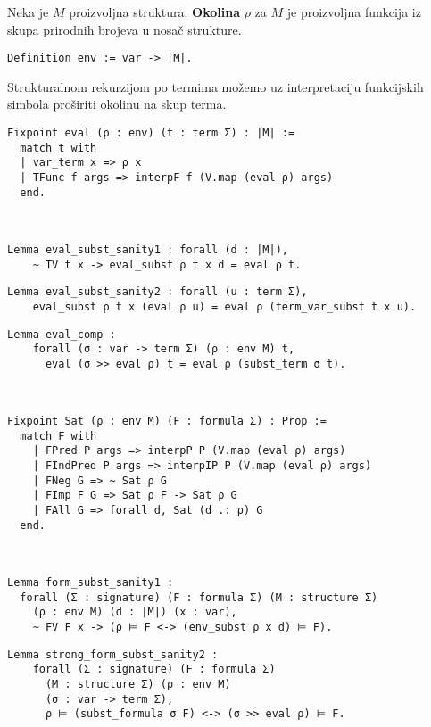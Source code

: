 \begin{definition}
  Neka je \(M\) proizvoljna struktura. \textbf{Okolina} \(\rho\) za \(M\) je proizvoljna funkcija iz skupa prirodnih brojeva u nosač strukture.
\begin{verbatim}
Definition env := var -> |M|.
\end{verbatim}
  Strukturalnom rekurzijom po termima možemo uz interpretaciju funkcijskih simbola proširiti okolinu na skup terma.
\begin{verbatim}
Fixpoint eval (ρ : env) (t : term Σ) : |M| :=
  match t with
  | var_term x => ρ x
  | TFunc f args => interpF f (V.map (eval ρ) args)
  end.
\end{verbatim}
\end{definition}

\begin{lemma}\
\begin{verbatim}
Lemma eval_subst_sanity1 : forall (d : |M|),
    ~ TV t x -> eval_subst ρ t x d = eval ρ t.
\end{verbatim}
\begin{verbatim}
Lemma eval_subst_sanity2 : forall (u : term Σ),
    eval_subst ρ t x (eval ρ u) = eval ρ (term_var_subst t x u).
\end{verbatim}
\begin{verbatim}
Lemma eval_comp :
    forall (σ : var -> term Σ) (ρ : env M) t,
      eval (σ >> eval ρ) t = eval ρ (subst_term σ t).
\end{verbatim}
\end{lemma}

\begin{definition}\
\begin{verbatim}
Fixpoint Sat (ρ : env M) (F : formula Σ) : Prop :=
  match F with
    | FPred P args => interpP P (V.map (eval ρ) args)
    | FIndPred P args => interpIP P (V.map (eval ρ) args)
    | FNeg G => ~ Sat ρ G
    | FImp F G => Sat ρ F -> Sat ρ G
    | FAll G => forall d, Sat (d .: ρ) G
  end.
\end{verbatim}
\end{definition}

\begin{lemma}\
\begin{verbatim}
Lemma form_subst_sanity1 :
  forall (Σ : signature) (F : formula Σ) (M : structure Σ)
    (ρ : env M) (d : |M|) (x : var),
    ~ FV F x -> (ρ ⊨ F <-> (env_subst ρ x d) ⊨ F).
\end{verbatim}
\begin{verbatim}
Lemma strong_form_subst_sanity2 :
    forall (Σ : signature) (F : formula Σ)
      (M : structure Σ) (ρ : env M)
      (σ : var -> term Σ),
      ρ ⊨ (subst_formula σ F) <-> (σ >> eval ρ) ⊨ F.
\end{verbatim}
\end{lemma}

